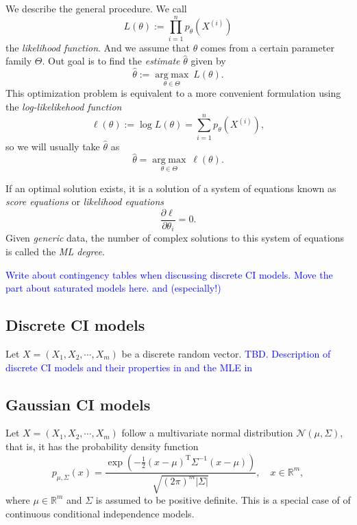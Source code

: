 \documentclass[10pt,a4paper]{article}
\begin{document}
We describe the general procedure. We call
\[L(\theta):=\prod_{i=1}^np_\theta(X^{(i)})\]
the \emph{likelihood function}. And we assume that $\theta$ comes from a certain parameter family $\Theta$. Out goal is to find the \emph{estimate} $\hat{\theta}$ given by
\[\hat{\theta} := \underset{\theta\in\Theta}{\operatorname{arg\;max}}\ L(\theta).\]
This optimization problem is equivalent to a more convenient formulation using the \emph{log-likelikehood function}
\begin{equation}\label{log-likelihood function}
\ell(\theta):= \log L(\theta)=\sum_{i=1}^np_\theta(X^{(i)}),
\end{equation}
so we will usually take $\hat{\theta}$ as
\begin{equation}\label{optimization problem}
\hat{\theta} = \underset{\theta\in\Theta}{\operatorname{arg\;max}}\ \ell(\theta).
\end{equation}


If an optimal solution exists, it is a solution of a system of equations known as \emph{score equations} or \emph{likelihood equations}
\[\frac{\partial \ell}{\partial \theta_i}=0.\]
Given \emph{generic} data, the number of complex solutions to this system of equations is called the \emph{ML degree}.

\textcolor{blue}{Write about contingency tables when discussing discrete CI models. Move the part about saturated models here. \cite[Chapter 1]{drton2008lectures} and (especially!) \cite[p.69]{lauritzen1996graphical}}
\subsection{Discrete CI models}
Let $X=(X_1,X_2,\cdots,X_m)$ be a discrete random vector.
\textcolor{blue}{TBD. Description of discrete CI models and their properties in \cite[pp. 70-73]{drton2008lectures} and the MLE in \cite[pp. 36-43]{drton2008lectures}}
\subsection{Gaussian CI models}
Let $X=(X_1,X_2,\cdots,X_m)$ follow a multivariate normal distribution $\mathcal{N}(\mu,\Sigma)$, that is, it has the probability density function
\[p_{\mu,\Sigma}(x) = \frac{\exp\left(-\frac 1 2 ({ x}-{\mu})^\mathrm{T}{\Sigma}^{-1}({x}-{\mu})\right)}{\sqrt{(2\pi)^m|\Sigma|}}, \quad x \in \mathbb{R}^m,\]
where $\mu \in \mathbb{R}^m$ and $\Sigma$ is assumed to be positive definite. This is a special case of of continuous conditional independence models.
\end{document}

